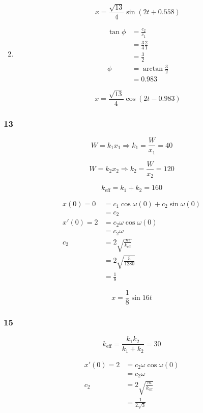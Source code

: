\documentclass{article}
\begin{document}
\begin{enumerate}
        \[x = \frac{\sqrt{13}}{4} \sin(2t + 0.558)\]

  \item

        \begin{align*}
          \tan \phi & = \frac{c_2}{c_1}         \\
                    & = \frac{3}{4} \frac{2}{1} \\
                    & = \frac{3}{2}             \\
          \phi      & = \arctan \frac{3}{2}     \\
                    & = 0.983
        \end{align*}

        \[x = \frac{\sqrt{13}}{4} \cos(2t - 0.983)\]
\end{enumerate}

\subsubsection{13}

\[W = k_1 x_1 \Rightarrow k_1 = \frac{W}{x_1} = 40\]

\[W = k_2 x_2 \Rightarrow k_2 = \frac{W}{x_2} = 120\]

\[k_\text{eff} = k_1 + k_2 = 160\]

\begin{align*}
  x(0) = 0  & = c_1 \cos \omega (0) + c_2 \sin \omega (0) \\
            & = c_2                                       \\
  x'(0) = 2 & = c_2 \omega \cos \omega (0)                \\
            & = c_2 \omega                                \\
  c_2       & = 2 \sqrt{\frac{m}{k_\text{eff}}}           \\
            & = 2 \sqrt{\frac{5}{1280}}                   \\
            & = \frac{1}{8}
\end{align*}

\[x = \frac{1}{8} \sin 16 t\]

\subsubsection{15}

\[k_\text{eff} = \frac{k_1 k_2}{k_1 + k_2} = 30\]

\begin{align*}
  x'(0) = 2 & = c_2 \omega \cos \omega (0)      \\
            & = c_2 \omega                      \\
  c_2       & = 2 \sqrt{\frac{m}{k_\text{eff}}} \\
            & = \frac{1}{2 \sqrt{3}}
\end{align*}
\end{document}
